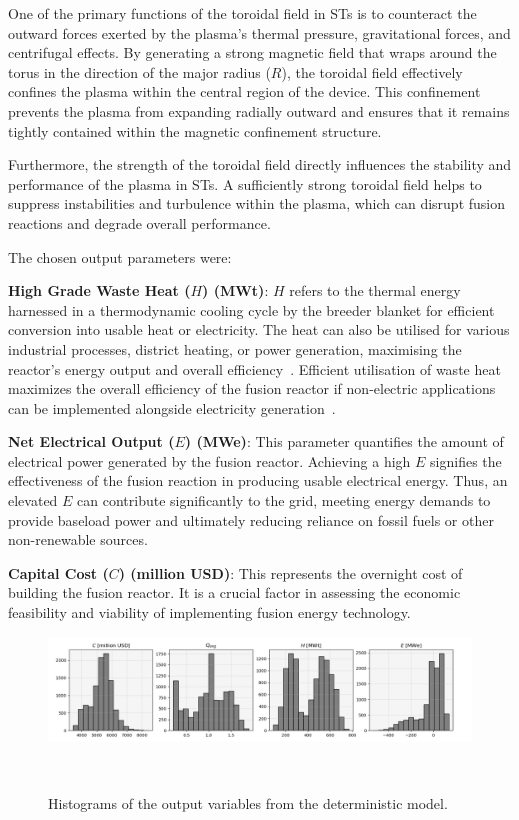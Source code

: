\documentclass[journal]{IEEEtran}
\begin{document}
One of the primary functions of the toroidal field in STs is to counteract the outward forces exerted by the plasma's thermal pressure, gravitational forces, and centrifugal effects. By generating a strong magnetic field that wraps around the torus in the direction of the major radius ($R$), the toroidal field effectively confines the plasma within the central region of the device. This confinement prevents the plasma from expanding radially outward and ensures that it remains tightly contained within the magnetic confinement structure.

Furthermore, the strength of the toroidal field directly influences the stability and performance of the plasma in STs. A sufficiently strong toroidal field helps to suppress instabilities and turbulence within the plasma, which can disrupt fusion reactions and degrade overall performance.

The chosen output parameters were:

\textbf{High Grade Waste Heat ($H$) (MWt)}: $H$ refers to the thermal energy harnessed in a thermodynamic cooling cycle by the breeder blanket for efficient conversion into usable heat or electricity. The heat can also be utilised for various industrial processes, district heating, or power generation, maximising the reactor's energy output and overall efficiency~\cite{Griffiths2022}. Efficient utilisation of waste heat maximizes the overall efficiency of the fusion reactor if non-electric applications can be implemented alongside electricity generation~\cite{Hidalgo-Salaverri2023}.

\textbf{Net Electrical Output ($E$) (MWe)}: This parameter quantifies the amount of electrical power generated by the fusion reactor. Achieving a high $E$ signifies the effectiveness of the fusion reaction in producing usable electrical energy. Thus, an elevated $E$ can contribute significantly to the grid, meeting energy demands to provide baseload power and ultimately reducing reliance on fossil fuels or other non-renewable sources. 

\textbf{Capital Cost ($C$) (million USD)}: This represents the overnight cost of building the fusion reactor. It is a crucial factor in assessing the economic feasibility and viability of implementing fusion energy technology. 

\begin{figure}[t]
    \centering
    \includegraphics[width=\columnwidth]{figures/methodology/output_distributions.png}
    \caption{\small Histograms of the output variables from the deterministic model.}~\label{fig:outputs_marchdata}
\end{figure}
\end{document}
